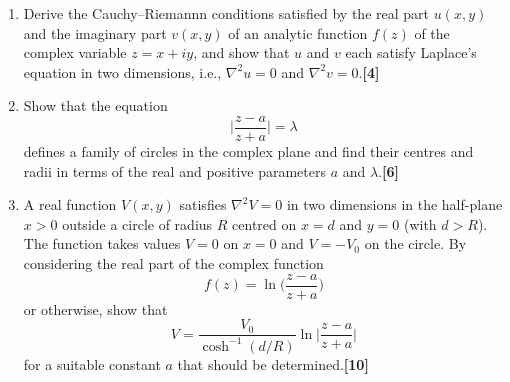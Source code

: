 \documentclass[a4paper]{article}
\begin{document}
\newpage
\begin{qns}\leavevmode
\begin{enumerate}[label=(\roman*)]
\item Derive the Cauchy–Riemannn conditions satisfied by the real part $u(x, y)$ and the imaginary part $v(x, y)$ of an analytic function $f(z)$ of the complex variable $z = x+iy$, and show that $u$ and $v$ each satisfy Laplace’s equation in two dimensions, i.e., $\nabla^2u = 0$ and $\nabla^2v = 0$.\hfill \textbf{[4]}
\item Show that the equation
$$\bigg|\frac{z-a}{z+a}\bigg|=\lambda$$
defines a family of circles in the complex plane and find their centres and radii in terms of the real and positive parameters $a$ and $\lambda$.\hfill \textbf{[6]}
\item A real function $V (x, y)$ satisfies $\nabla^2V=0$ in two dimensions in the half-plane $x > 0$ outside a circle of radius $R$ centred on $x = d$ and $y = 0$ (with $d > R$). The function
takes values $V = 0$ on $x = 0$ and $V = −V_0$ on the circle. By considering the real part of the complex function
$$f(z)=\ln\bigg(\frac{z-a}{z+a}\bigg)$$
or otherwise, show that
$$V=\frac{V_0}{\cosh^{-1}(d/R)}\ln\bigg|\frac{z-a}{z+a}\bigg|$$
for a suitable constant $a$ that should be determined.\hfill \textbf{[10]}
\end{enumerate}
\end{qns}
\end{document}
